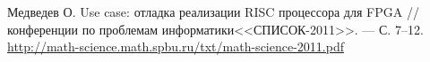 \documentclass{math-mech-sci}
\begin{document}
\begin{thebibliography}{8}

 Медведев О. Use case: отладка реализации RISC
  процессора для FPGA // %
  конференции по проблемам информатики<<СПИСОК-2011>>. --- %
  С. 7--12.
  \href{http://math-science.math.spbu.ru/txt/math-science-2011.pdf}{http://math-science.math.spbu.ru/txt/math-science-2011.pdf}

\end{thebibliography}
\end{document}
